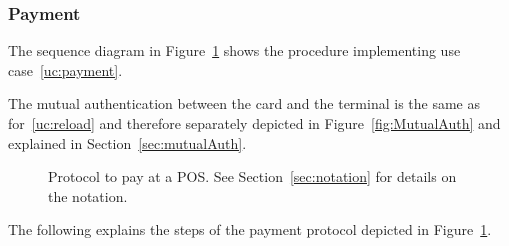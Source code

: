 \documentclass{article}
\begin{document}
\subsubsection{Payment}
The sequence diagram in Figure~\ref{fig:POSProtocol} shows the procedure implementing use case~\ref{uc:payment}.

The mutual authentication between the card and the terminal is the same as for~\ref{uc:reload} and therefore separately depicted in Figure~\ref{fig:MutualAuth} and explained in Section~\ref{sec:mutualAuth}.

\begin{figure}
    \centering
    
    \caption{Protocol to pay at a POS.
    See Section~\ref{sec:notation} for details on the notation.
    }
    \label{fig:POSProtocol}
\end{figure}

The following explains the steps of the payment protocol depicted in Figure~\ref{fig:POSProtocol}.
\end{document}
